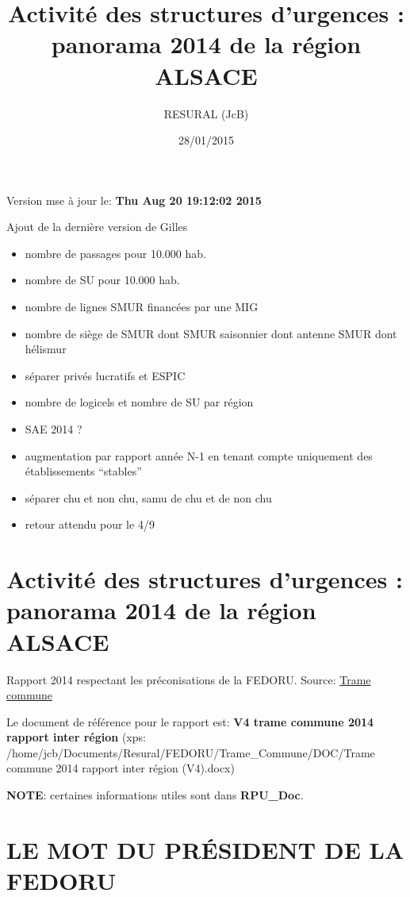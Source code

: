 \documentclass[]{article}
\title{Activité des structures d'urgences : panorama 2014 de la région ALSACE}
\author{RESURAL (JcB)}
\date{28/01/2015}
\begin{document}
\maketitle


{
\hypersetup{linkcolor=black}
\setcounter{tocdepth}{3}
\tableofcontents
}
Version mse à jour le: \textbf{Thu Aug 20 19:12:02 2015}

Ajout de la dernière version de Gilles

\begin{itemize}
\itemsep1pt\parskip0pt
\item
  nombre de passages pour 10.000 hab.
\item
  nombre de SU pour 10.000 hab.
\item
  nombre de lignes SMUR financées par une MIG
\item
  nombre de siège de SMUR dont SMUR saisonnier dont antenne SMUR dont
  hélismur
\item
  séparer privés lucratifs et ESPIC
\item
  nombre de logicels et nombre de SU par région
\item
  SAE 2014 ?
\item
  augmentation par rapport année N-1 en tenant compte uniquement des
  établissements ``stables''
\item
  séparer chu et non chu, samu de chu et de non chu
\item
  retour attendu pour le 4/9
\end{itemize}

\section{Activité des structures d'urgences : panorama 2014 de la région
ALSACE}\label{activite-des-structures-durgences-panorama-2014-de-la-region-alsace}

Rapport 2014 respectant les préconisations de la FEDORU. Source:
\href{https://docs.google.com/document/d/101LYVqVLeHZnrujfMm3aqBYfbOwx3CPEB3Y-Lbud2Ls/edit}{Trame
commune}

Le document de référence pour le rapport est: \textbf{V4 trame commune
2014 rapport inter région} (xps:
/home/jcb/Documents/Resural/FEDORU/Trame\_Commune/DOC/Trame commune 2014
rapport inter région (V4).docx)

\textbf{NOTE}: certaines informations utiles sont dans
\textbf{RPU\_Doc}.

\section{LE MOT DU PRÉSIDENT DE LA
FEDORU}\label{le-mot-du-president-de-la-fedoru}
\end{document}
